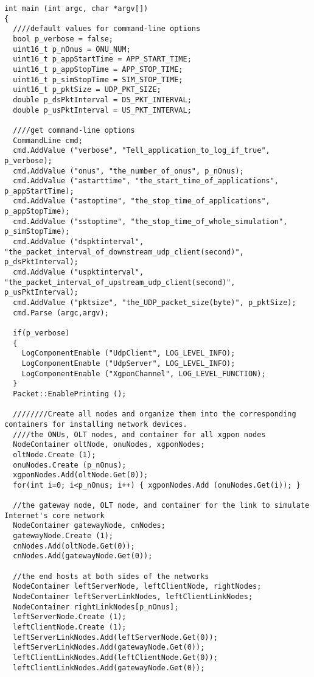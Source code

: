 \begin{lstlisting}
int main (int argc, char *argv[])
{
  ////default values for command-line options
  bool p_verbose = false;
  uint16_t p_nOnus = ONU_NUM;
  uint16_t p_appStartTime = APP_START_TIME;
  uint16_t p_appStopTime = APP_STOP_TIME;
  uint16_t p_simStopTime = SIM_STOP_TIME;
  uint16_t p_pktSize = UDP_PKT_SIZE;
  double p_dsPktInterval = DS_PKT_INTERVAL;
  double p_usPktInterval = US_PKT_INTERVAL;

  ////get command-line options
  CommandLine cmd;
  cmd.AddValue ("verbose", "Tell_application_to_log_if_true", p_verbose);
  cmd.AddValue ("onus", "the_number_of_onus", p_nOnus);
  cmd.AddValue ("astarttime", "the_start_time_of_applications", p_appStartTime);
  cmd.AddValue ("astoptime", "the_stop_time_of_applications", p_appStopTime);
  cmd.AddValue ("sstoptime", "the_stop_time_of_whole_simulation", p_simStopTime);
  cmd.AddValue ("dspktinterval", "the_packet_interval_of_downstream_udp_client(second)", p_dsPktInterval);
  cmd.AddValue ("uspktinterval", "the_packet_interval_of_upstream_udp_client(second)", p_usPktInterval);
  cmd.AddValue ("pktsize", "the_UDP_packet_size(byte)", p_pktSize);
  cmd.Parse (argc,argv);

  if(p_verbose)
  {
    LogComponentEnable ("UdpClient", LOG_LEVEL_INFO);
    LogComponentEnable ("UdpServer", LOG_LEVEL_INFO);
    LogComponentEnable ("XgponChannel", LOG_LEVEL_FUNCTION);
  }
  Packet::EnablePrinting ();

  ////////Create all nodes and organize them into the corresponding containers for installing network devices.
  ////the ONUs, OLT nodes, and container for all xgpon nodes
  NodeContainer oltNode, onuNodes, xgponNodes;
  oltNode.Create (1);
  onuNodes.Create (p_nOnus);
  xgponNodes.Add(oltNode.Get(0));
  for(int i=0; i<p_nOnus; i++) { xgponNodes.Add (onuNodes.Get(i)); }

  //the gateway node, OLT node, and container for the link to simulate Internet's core network
  NodeContainer gatewayNode, cnNodes;
  gatewayNode.Create (1);
  cnNodes.Add(oltNode.Get(0));
  cnNodes.Add(gatewayNode.Get(0));

  //the end hosts at both sides of the networks
  NodeContainer leftServerNode, leftClientNode, rightNodes;
  NodeContainer leftServerLinkNodes, leftClientLinkNodes;
  NodeContainer rightLinkNodes[p_nOnus];
  leftServerNode.Create (1);
  leftClientNode.Create (1);
  leftServerLinkNodes.Add(leftServerNode.Get(0));
  leftServerLinkNodes.Add(gatewayNode.Get(0));
  leftClientLinkNodes.Add(leftClientNode.Get(0));
  leftClientLinkNodes.Add(gatewayNode.Get(0));


\end{lstlisting}
